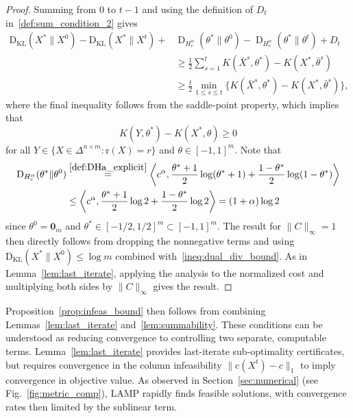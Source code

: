 \documentclass[10pt]{article}
\newcommand{\DHa}{\D_{H_c^\alpha}}
\newcommand{\inner}[2]{\left\langle #1,#2\right\rangle}
\newcommand{\D}{\operatorname{D}}
\theoremstyle{plain}
\theoremstyle{definition}
\theoremstyle{remark}
\newcommand{\KL}{\mathrm{D}_\mathrm{KL}}
\newcommand{\zero}{\mathbf{0}}
\newcommand{\col}{\bm{\mathrm{c}}}
\newcommand{\row}{\bm{\mathrm{r}}}
\begin{document}
\begin{proof}
    Summing from $0$ to $t-1$ and using the definition of $D_t$ in~\eqref{def:sum_condition_2} gives
    \begin{align*}
        \KL(X^*\|X^0)-\KL(X^*\|X^{t})+&\DHa(\theta^*\|\theta^0)-\DHa(\theta^*\|\theta^t)+D_t\\
        &\geq \frac{1}{2}\sum_{s=1}^{t}K(\bar X^{s},\theta^*)-K(X^{*},\bar\theta^{s}) \\
        &\geq \frac{t}{2}\min_{1\leq s\leq t}\{K(\bar X^{s},\theta^*)-K(X^{*},\bar\theta^{s})\},
    \end{align*}
    where the final inequality follows from the saddle-point property, which implies that 
    \begin{equation}
        K(Y,\theta^*)-K(X^*,\theta) \ge 0
    \end{equation}
    for all $Y\in\{X\in\Delta^{n\times m}:\row(X)=r\}$ and $\theta\in[-1,1]^m$. Note that
    \begin{align}
        \nonumber\DHa(\theta^*\|\theta^0)&\stackrel{\eqref{def:DHa_explicit}}=\inner{c^\alpha}{\frac{\theta^*+1}{2}\log(\theta^*+1) + \frac{1-\theta^*}{2}\log(1-\theta^*)}\\
        \label{ineq:dual_div_bound}&\leq \inner{c^\alpha}{\frac{\theta^*+1}{2}\log2 + \frac{1-\theta^*}{2}\log2}=(1+\alpha)\log 2
    \end{align}
    since $\theta^0=\zero_m$ and $\theta^*\in[-1/2,1/2]^m\subset[-1,1]^m$.
    The result for $\|C\|_\infty=1$ then directly follows from dropping the nonnegative terms and using $\KL(X^*\|X^0)\leq\log m$ combined with~\eqref{ineq:dual_div_bound}. As in Lemma~\ref{lem:last_iterate}, applying the analysis to the normalized cost and multiplying both sides by $\|C\|_\infty$ gives the result.
\end{proof}
Proposition~\ref{prop:infeas_bound} then follows from combining Lemmas~\ref{lem:last_iterate} and~\ref{lem:summability}. These conditions can be understood as reducing convergence to controlling two separate, computable terms. Lemma~\ref{lem:last_iterate} provides last-iterate sub-optimality certificates, but requires convergence in the column infeasibility $\|\col(X^t)-c\|_1$ to imply convergence in objective value. As observed in Section~\ref{sec:numerical} (see Fig.~\ref{fig:metric_comp}), LAMP rapidly finds feasible solutions, with convergence rates then limited by the sublinear term.
 
\end{document}
